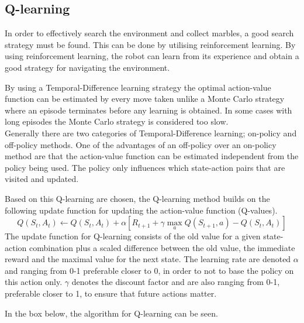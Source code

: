 \documentclass[../Head/Main.tex]{subfiles}
\begin{document}
\subsection{Q-learning}
In order to effectively search the environment and collect marbles, a good search strategy must be found. This can be done by utilising reinforcement learning. By using reinforcement learning, the robot can learn from its experience and obtain a good strategy for navigating the environment.\par
By using a Temporal-Difference learning strategy the optimal action-value function can be estimated by every move taken unlike a Monte Carlo strategy where an episode terminates before any learning is obtained. In some cases with long episodes the Monte Carlo strategy is considered too slow.\\
Generally there are two categories of Temporal-Difference learning; on-policy and off-policy methods. One of the advantages of an off-policy over an on-policy method are that the action-value function can be estimated independent from the policy being used. The policy only influences which state-action pairs that are visited and updated.\par 
Based on this Q-learning are chosen, the Q-learning method builds on the following update function for updating the action-value function (Q-values).
\begin{equation}\label{eq:q_update_func}
Q\left(S_t,A_t\right) \leftarrow Q\left(S_t,A_t\right) + \alpha\left[R_{t+1}+\gamma\max_a Q\left(S_{t+1},a\right)-Q\left(S_t,A_t\right)\right]
\end{equation}
The update function for Q-learning consists of the old value for a given state-action combination plus a scaled difference between the old value, the immediate reward and the maximal value for the next state. The learning rate are denoted $\alpha$ and ranging from 0-1 preferable closer to 0, in order to not to base the policy on this action only. $\gamma$ denotes the discount factor and are also ranging from 0-1, preferable closer to 1, to ensure that future actions matter.\par
In the box below, the algorithm for Q-learning can be seen.

\end{document}

